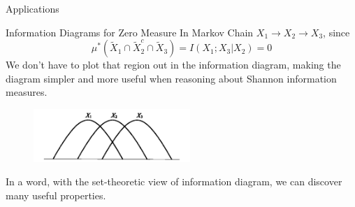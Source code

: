 \begin{frame}{Applications}
    \begin{block}{Information Diagrams for Zero Measure}
        In Markov Chain $X_{1} \rightarrow X_{2} \rightarrow X_{3}$, since \begin{equation}\mu^{*}\left(\tilde{X}_{1} \cap \tilde{X}_{2}^{c} \cap \tilde{X}_{3}\right)=I\left(X_{1} ; X_{3} | X_{2}\right)=0\end{equation}
        We don't have to plot that region out in the information diagram, making the diagram simpler and more useful when reasoning about Shannon information measures.
    \end{block}
    \begin{figure}
        \centering
        \includegraphics[height = 2cm]{img/Im4.png}
        \label{fig:MCID}
    \end{figure}
    
    In a word, with the set-theoretic view of information diagram, we can discover many useful properties.
\end{frame}
